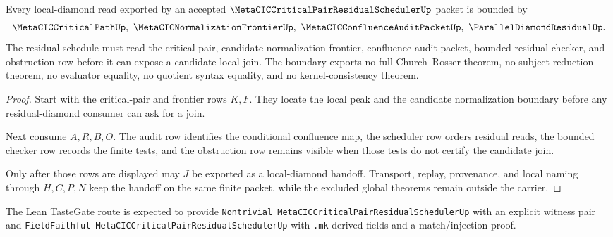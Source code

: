 \begin{theorem}
\label{thm:metacic-critical-pair-residual-scheduler-diamond-boundary}
Every local-diamond read exported by an accepted $\MetaCICCriticalPairResidualSchedulerUp$ packet is bounded by
$$
\MetaCICCriticalPathUp,\ \MetaCICNormalizationFrontierUp,\ \MetaCICConfluenceAuditPacketUp,\ \ParallelDiamondResidualUp .
$$
The residual schedule must read the critical pair, candidate normalization frontier, confluence audit packet, bounded residual checker, and obstruction row before it can expose a candidate local join. The boundary exports no full Church--Rosser theorem, no subject-reduction theorem, no evaluator equality, no quotient syntax equality, and no kernel-consistency theorem.
\end{theorem}
\begin{proof}
Start with the critical-pair and frontier rows $K,F$. They locate the local peak and the candidate normalization boundary before any residual-diamond consumer can ask for a join.

Next consume $A,R,B,O$. The audit row identifies the conditional confluence map, the scheduler row orders residual reads, the bounded checker row records the finite tests, and the obstruction row remains visible when those tests do not certify the candidate join.

Only after those rows are displayed may $J$ be exported as a local-diamond handoff. Transport, replay, provenance, and local naming through $H,C,P,N$ keep the handoff on the same finite packet, while the excluded global theorems remain outside the carrier.
\end{proof}



The Lean TasteGate route is expected to provide \texttt{Nontrivial MetaCICCriticalPairResidualSchedulerUp} with an explicit witness pair and \texttt{FieldFaithful MetaCICCriticalPairResidualSchedulerUp} with \texttt{.mk}-derived fields and a match/injection proof.

